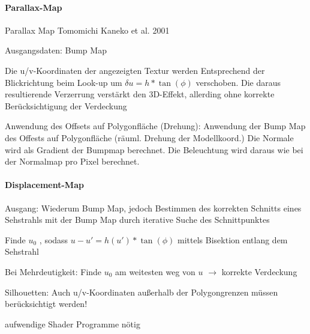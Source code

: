 \documentclass[landscape]{article}
\begin{document}
\begin{multicols}{3}
  \paragraph{Parallax-Map}
  \begin{itemize*}
    \item Parallax Map Tomomichi Kaneko et al. 2001
    \item Ausgangsdaten: Bump Map
    \item Die u/v-Koordinaten der angezeigten Textur werden Entsprechend der Blickrichtung beim Look-up um $\delta u = h * \tan(\phi)$ verschoben. Die daraus resultierende Verzerrung verstärkt den 3D-Effekt, allerding ohne korrekte Berücksichtigung der Verdeckung
    \item Anwendung des Offsets auf Polygonfläche (Drehung): Anwendung der Bump Map des Offests auf Polygonfläche (räuml. Drehung der Modellkoord.) Die Normale wird als Gradient der Bumpmap berechnet. Die Beleuchtung wird daraus wie bei der Normalmap pro Pixel berechnet.
  \end{itemize*}
  
  \paragraph{Displacement-Map}
  \begin{itemize*}
    \item Ausgang: Wiederum Bump Map, jedoch Bestimmen des korrekten Schnitts eines Sehstrahls mit der Bump Map durch iterative Suche des Schnittpunktes
    \item Finde $u_0$ , sodass $u-u' = h(u') * \tan(\phi)$ mittels Bisektion entlang dem Sehstrahl
    \item Bei Mehrdeutigkeit: Finde $u_0$ am weitesten weg von $u$ $\rightarrow$ korrekte Verdeckung
    \item Silhouetten: Auch u/v-Koordinaten außerhalb der Polygongrenzen müssen berücksichtigt werden!
    \item aufwendige Shader Programme nötig
  \end{itemize*}
  

\end{multicols}
\end{document}
